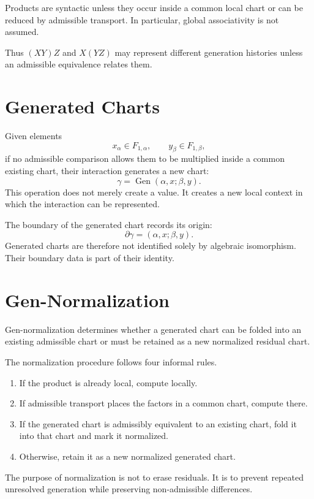 \documentclass[11pt]{article}
\begin{document}
Products are syntactic unless they occur inside a common local chart or can be reduced by admissible transport. In particular, global associativity is not assumed.

Thus $(XY)Z$ and $X(YZ)$ may represent different generation histories unless an admissible equivalence relates them.

\section{Generated Charts}

Given elements
\[
x_\alpha\in F_{1,\alpha},\qquad y_\beta\in F_{1,\beta},
\]
if no admissible comparison allows them to be multiplied inside a common existing chart, their interaction generates a new chart:
\[
\gamma=\operatorname{Gen}(\alpha,x;\beta,y).
\]
This operation does not merely create a value. It creates a new local context in which the interaction can be represented.

The boundary of the generated chart records its origin:
\[
\partial\gamma=(\alpha,x;\beta,y).
\]
Generated charts are therefore not identified solely by algebraic isomorphism. Their boundary data is part of their identity.

\section{Gen-Normalization}
\label{sec:gen-normalization}

Gen-normalization determines whether a generated chart can be folded into an existing admissible chart or must be retained as a new normalized residual chart.

The normalization procedure follows four informal rules.
\begin{enumerate}
  \item If the product is already local, compute locally.
  \item If admissible transport places the factors in a common chart, compute there.
  \item If the generated chart is admissibly equivalent to an existing chart, fold it into that chart and mark it normalized.
  \item Otherwise, retain it as a new normalized generated chart.
\end{enumerate}

The purpose of normalization is not to erase residuals. It is to prevent repeated unresolved generation while preserving non-admissible differences.
\end{document}
